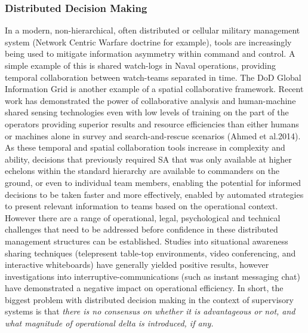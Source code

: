 \subsubsection{Distributed Decision Making}
In a modern, non-hierarchical, often distributed or cellular military management system (Network Centric Warfare doctrine for example), tools are increasingly being used to mitigate information asymmetry within command and control.
A simple example of this is shared watch-logs in Naval operations, providing temporal collaboration between watch-teams separated in time.
The DoD Global Information Grid is another example of a spatial collaborative framework.
Recent work has demonstrated the power of collaborative analysis and human-machine shared sensing technologies even with low levels of training on the part of the operators providing superior results and resource efficiencies than either humans or machines alone in survey and search-and-rescue scenarios (Ahmed et al.2014).
As these temporal and spatial collaboration tools increase in complexity and ability, decisions that previously required SA that was only available at higher echelons within the standard hierarchy are available to commanders on the ground, or even to individual team members, enabling the potential for informed decisions to be taken faster and more effectively, enabled by automated strategies to present relevant information to teams based on the operational context.
However there are a range of operational, legal, psychological and technical challenges that need to be addressed before confidence in these distributed management structures can be established.
Studies into situational awareness sharing techniques (telepresent table-top environments, video conferencing, and interactive whiteboards) have generally yielded positive results, however investigations into interruptive-communications (such as instant messaging chat) have demonstrated a negative impact on operational efficiency.
In short, the biggest problem with distributed decision making in the context of supervisory systems is that \textit{there is no consensus on whether it is advantageous or not, and what magnitude of operational delta is introduced, if any.}

